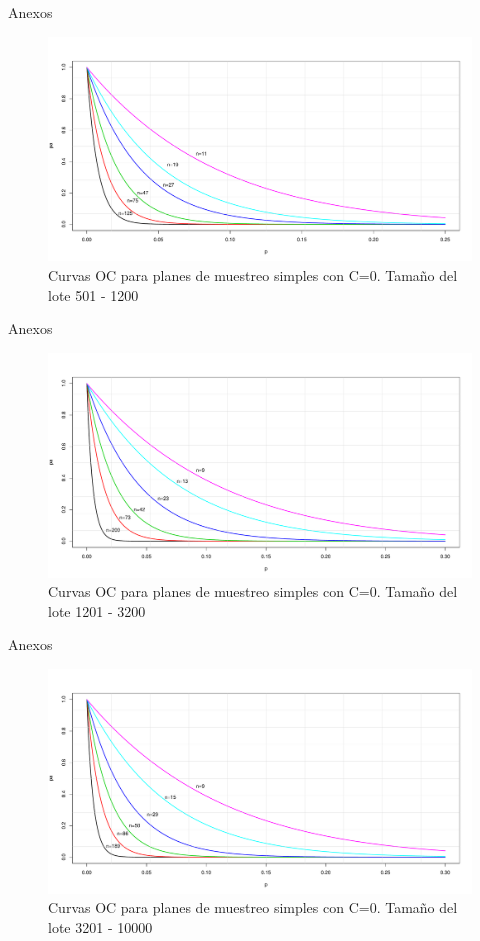 \documentclass[10pt]{beamer}
\begin{document}
\begin{frame}{Anexos}
\begin{figure}[h!]
  \centering
  \includegraphics[scale=0.33]{FigurasUV/CO9.pdf}
  \caption{Curvas OC para planes de muestreo simples con C=0. Tamaño del lote 501 - 1200}
\end{figure}
\end{frame}

\begin{frame}{Anexos}
\begin{figure}[h!]
  \centering
  \includegraphics[scale=0.33]{FigurasUV/CO10.pdf}
  \caption{Curvas OC para planes de muestreo simples con C=0. Tamaño del lote 1201 - 3200}
\end{figure}
\end{frame}

\begin{frame}{Anexos}
\begin{figure}[h!]
  \centering
  \includegraphics[scale=0.33]{FigurasUV/CO11.pdf}
  \caption{Curvas OC para planes de muestreo simples con C=0. Tamaño del lote 3201 - 10000}
\end{figure}
\end{frame}
\end{document}
